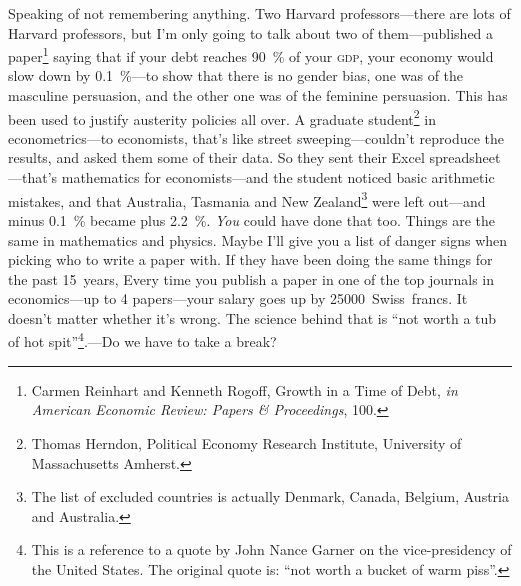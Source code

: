\documentclass[10pt, a4paper, twoside]{lecturenotes}
\begin{document}
\begin{lecture}[date=2013-04-25]
Speaking of not remembering anything. Two Harvard professors---there are lots of Harvard professors, but I'm only going to talk about two of them---published a paper\footnote{Carmen Reinhart and Kenneth Rogoff, Growth in a Time of Debt, \emph{in American Economic
Review: Papers \& Proceedings}, 100.} saying that if your debt reaches 90~\% of your \textsc{gdp}, your economy would slow down by 0.1~\%---to show that there is no gender bias, one was of the masculine persuasion, and the other one was of the feminine persuasion. This has been used to justify austerity policies all over. A graduate student\footnote{Thomas Herndon, Political Economy Research Institute, University of Massachusetts Amherst.} in econometrics---to economists, that's like street sweeping---couldn't reproduce the results, and asked them some of their data. So they sent their Excel spreadsheet---that's mathematics for economists---and the student noticed basic arithmetic mistakes, and that Australia, Tasmania and New Zealand\footnote{The list of excluded countries is actually Denmark, Canada, Belgium, Austria and Australia.} were left out---and minus 0.1~\% became plus 2.2~\%. \emph{You} could have done that too. Things are the same in mathematics and physics. Maybe I'll give you a list of danger signs when picking who to write a paper with. If they have been doing the same things for the past 15~years,   Every time you publish a paper in one of the top journals in economics---up to 4 papers---your salary goes up by 25000~Swiss~francs. It doesn't matter whether it's wrong. The science behind that is ``not worth a tub of hot spit''\footnote{This is a reference to a quote by John Nance Garner on the vice-presidency of the United States. The original quote is: ``not worth a bucket of warm piss''.}.---Do we have to take a break?


\end{lecture}
\end{document}
